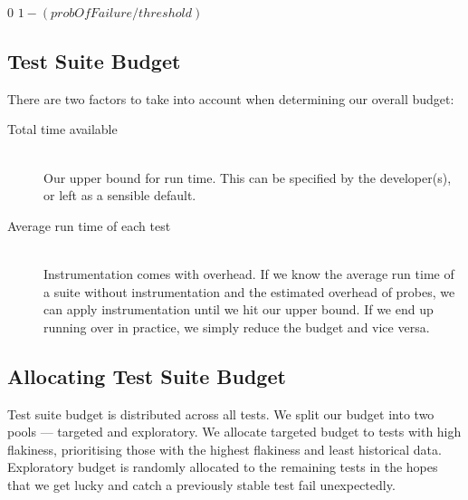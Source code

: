 {\begin{defn}[\Flakiness{}]
\end{defn}

\begin{algorithm}[h]
\caption{}
\label{alg:calculate_flakiness}
\begin{algorithmic}
	\Require{$probOfFailure$ and $threshold$ are decimal values within ranges $[0..1]$ and $(0..1]$ respectively.}
    \Statex


		\State \Return $0$
	\Else
		\State \Return $1 - (probOfFailure / threshold)$
	\EndIf

	\EndFunction
\end{algorithmic}
\end{algorithm}

\subsection{Test Suite Budget}
\label{sec:sec:budget}

There are two factors to take into account when determining our overall budget:

\begin{description}
	\item[Total time available] \hfill \\
 		Our upper bound for run time. This can be specified by the developer(s), or left as a sensible default.
	\item[Average run time of each test] \hfill \\
		Instrumentation comes with overhead. If we know the average run time of a suite without instrumentation and the estimated overhead of probes, we can apply instrumentation until we hit our upper bound. If we end up running over in practice, we simply reduce the budget and vice versa.
\end{description}


\subsection{Allocating Test Suite Budget}
\label{sec:sec:allocating_budget}

Test suite budget is distributed across all tests. We split our budget into two pools --- targeted and exploratory. We allocate targeted budget to tests with high flakiness, prioritising those with the highest flakiness and least historical data. Exploratory budget is randomly allocated to the remaining tests in the hopes that we get lucky and catch a previously stable test fail unexpectedly.

}
